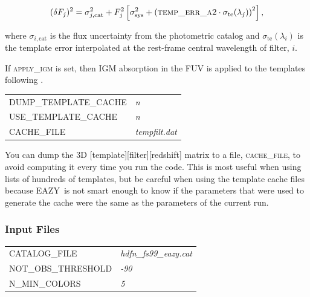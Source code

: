 \documentclass[11pt]{article}
\newcommand{\eazy}{\textsc{EAZY}}
\begin{document}
\begin{equation}
(\delta F_j)^2 = \sigma_{j,\mathrm{cat}}^2 + F_j^2 \left[\sigma_\mathrm{sys}^2+\left(\textsc{temp\_err\_a2}\cdot\sigma_\mathrm{te}(\lambda_{j})\right)^2\right], \label{full_error}
\end{equation}

where $\sigma_{i,\mathrm{cat}}$ is the flux uncertainty from the photometric
catalog and $\sigma_\mathrm{te}(\lambda_{i})$ is the template error
interpolated at the rest-frame central wavelength of filter, $i$.

If \textsc{apply\_igm} is set, then IGM absorption in the FUV is applied to the
templates following \cite{madau95}.

\vspace*{0.25cm}\begin{tabular}{ll}
 \textsc{DUMP\_TEMPLATE\_CACHE} & \textsl{  n                 } \\
 \textsc{USE\_TEMPLATE\_CACHE  } & \textsl{ n                 } \\
 \textsc{CACHE\_FILE       } & \textsl{    tempfilt.dat       } 
\end{tabular}

\vspace*{0.25cm}You can dump the 3D [template][filter][redshift] matrix to a
file, \textsc{cache\_file}, to avoid computing it every time you run the code. 
This is most useful when using lists of hundreds of templates, but be careful
when using the template cache files because \eazy\ is not smart enough to know
if the parameters that were used to generate the cache were the same as the
parameters of the current run.

\subsubsection{Input Files} \label{s:input_files}
\begin{tabular}{ll}
 \textsc{CATALOG\_FILE     } & \textsl{    hdfn\_fs99\_eazy.cat      } \\
 \textsc{NOT\_OBS\_THRESHOLD } & \textsl{   -90                } \\
 \textsc{N\_MIN\_COLORS      } & \textsl{   5                 } 
\end{tabular}
\end{document}
